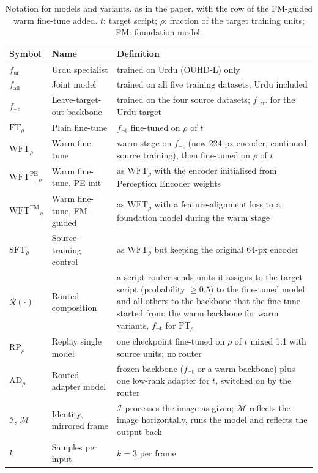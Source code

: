 \documentclass[10pt,a4paper]{article}
\newcommand{\botrule}{\bottomrule}
\newcommand{\fur}{f_{\mathrm{ur}}}
\newcommand{\fall}{f_{\mathrm{all}}}
\newcommand{\fnot}[1]{f_{\neg\mathrm{#1}}}
\newcommand{\FT}[1]{\mathrm{FT}_{#1}}
\newcommand{\WFT}[1]{\mathrm{WFT}_{#1}}
\newcommand{\WFTpe}[1]{\mathrm{WFT}^{\mathrm{PE}}{}_{#1}}
\newcommand{\WFTfm}[1]{\mathrm{WFT}^{\mathrm{FM}}{}_{#1}}
\newcommand{\SFT}[1]{\mathrm{SFT}_{#1}}
\newcommand{\RP}[1]{\mathrm{RP}_{#1}}
\newcommand{\AD}[1]{\mathrm{AD}_{#1}}
\newcommand{\Rt}{\mathcal{R}}
\newcommand{\Fi}{\mathcal{I}}
\newcommand{\Fm}{\mathcal{M}}
\begin{document}
\begin{table}[!htbp]
\centering
\caption{Notation for models and variants, as in the paper, with the row of the FM-guided warm fine-tune added. $t$: target script; $\rho$: fraction of the target training units; FM: foundation model.}\label{tabS:notation}
\scriptsize
\begin{tabular}{@{}llp{}@{}}
\toprule
Symbol & Name & Definition\\
\midrule
$\fur$ & Urdu specialist & trained on Urdu (OUHD-L) only\\
$\fall$ & Joint model & trained on all five training datasets, Urdu included\\
$\fnot{t}$ & Leave-target-out backbone & trained on the four source datasets; $\fnot{ur}$ for the Urdu target\\
$\FT{\rho}$ & Plain fine-tune & $\fnot{t}$ fine-tuned on $\rho$ of $t$\\
$\WFT{\rho}$ & Warm fine-tune & warm stage on $\fnot{t}$ (new 224-px encoder, continued source training), then fine-tuned on $\rho$ of $t$\\
$\WFTpe{\rho}$ & Warm fine-tune, PE init & as $\WFT{\rho}$ with the encoder initialised from Perception Encoder weights\\
$\WFTfm{\rho}$ & Warm fine-tune, FM-guided & as $\WFT{\rho}$ with a feature-alignment loss to a foundation model during the warm stage\\
$\SFT{\rho}$ & Source-training control & as $\WFT{\rho}$ but keeping the original 64-px encoder\\
$\Rt(\cdot)$ & Routed composition & a script router sends units it assigns to the target script (probability $\ge 0.5$) to the fine-tuned model and all others to the backbone that the fine-tune started from: the warm backbone for warm variants, $\fnot{t}$ for $\FT{\rho}$\\
$\RP{\rho}$ & Replay single model & one checkpoint fine-tuned on $\rho$ of $t$ mixed 1:1 with source units; no router\\
$\AD{\rho}$ & Routed adapter model & frozen backbone ($\fnot{t}$ or a warm backbone) plus one low-rank adapter for $t$, switched on by the router\\
$\Fi$, $\Fm$ & Identity, mirrored frame & $\Fi$ processes the image as given; $\Fm$ reflects the image horizontally, runs the model and reflects the output back\\
$k$ & Samples per input & $k=3$ per frame\\
\botrule
\end{tabular}
\end{table}
\end{document}

